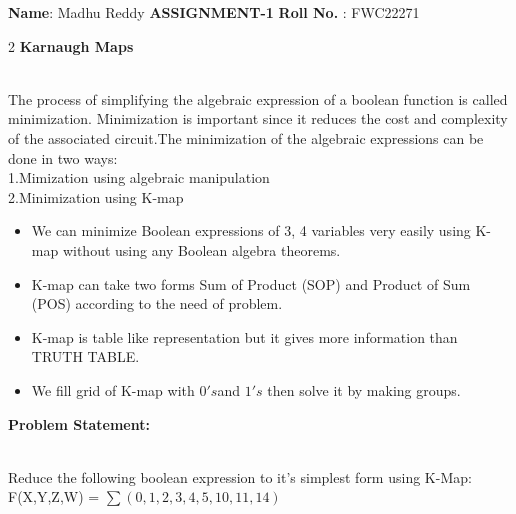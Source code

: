 \documentclass[10pt,a4paper]{report}
\begin{document}
\raggedright \textbf{Name}:\hspace{1mm} Madhu Reddy\hspace{3cm} \Large \textbf{ASSIGNMENT-1}\hspace{2.5cm} %
\normalsize \textbf{Roll No.} :\hspace{1mm} FWC22271\vspace{2cm}
\begin{multicols}{2}
\hspace{7.5cm} \textbf{Karnaugh Maps}\vspace{0.5cm}
\raggedright \\The process of simplifying the algebraic expression of a boolean function is called minimization. Minimization is important since it reduces the cost and complexity of the associated circuit.The minimization of the algebraic expressions can be done in two ways:\\1.Mimization using algebraic manipulation\\2.Minimization using K-map \vspace{3mm} \\ \begin{itemize}


\item We can minimize Boolean expressions of 3, 4 variables very easily using K-map without using any Boolean algebra theorems.
\item K-map can take two forms Sum of Product (SOP) and Product of Sum (POS) according to the need of problem. 
\item K-map is table like representation but it gives more information than TRUTH TABLE.
\item We fill grid of K-map with $0's $and $1's$ then solve it by making groups.\vspace{2mm}
\end{itemize}
\raggedright \textbf{Problem Statement:}\vspace{2mm}
\raggedright \\Reduce the following boolean expression to it's simplest form using K-Map:
\center F(X,Y,Z,W) = $\sum(0,1,2,3,4,5,10,11,14)$
\vspace{5mm}



\newcommand{\implicantsol}[3][0]{
    \draw[rounded corners=3pt, fill=#3, opacity=0.3] ($(#2.north west)+(135:#1)$) rectangle ($(#2.south east)+(-45:#1)$);
    }



\end{multicols}
\end{document}

